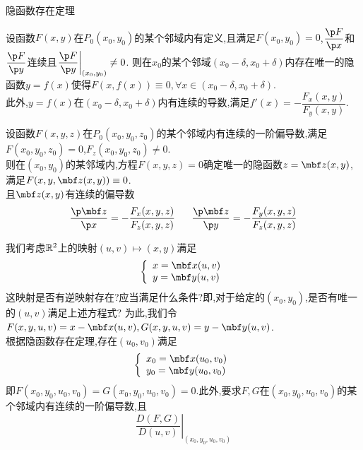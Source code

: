 \documentclass{ctexart}
\begin{document}
\pagestyle{empty}
\begin{center}\large 隐函数存在定理\end{center}
\begin{theorem}[Theorem I]
    设函数$F(x,y)$在$P_0(x_0,y_0)$的某个邻域内有定义,且满足$F(x_0,y_0)=0$,$\dfrac{\p F}{\p x}$和$\dfrac{\p F}{\p y}$连续且$\left.\dfrac{\p F}{\p y}\right|_{(x_0,y_0)}\neq0$.%
    则在$x_0$的某个邻域$(x_0-\delta,x_0+\delta)$内存在唯一的隐函数$y=f(x)$使得$F(x,f(x))\equiv0,\forall x\in(x_0-\delta,x_0+\delta)$.\\
    此外,$y=f(x)$在$(x_0-\delta,x_0+\delta)$内有连续的导数,满足$f'(x)=-\dfrac{F_x(x,y)}{F_y(x,y)}$.
\end{theorem}
\begin{theorem}[Theorem II]
    设函数$F(x,y,z)$在$P_0(x_0,y_0,z_0)$的某个邻域内有连续的一阶偏导数,满足$F(x_0,y_0,z_0)=0$,$F_z(x_0,y_0,z_0)\neq0$.\\
    则在$(x_0,y_0)$的某邻域内,方程$F(x,y,z)=0$确定唯一的隐函数$z=\mbf z(x,y)$,满足$F(x,y,\mbf z(x,y))\equiv0$.\\
    且$\mbf z(x,y)$有连续的偏导数
    \[\dfrac{\p\mbf z}{\p x}=-\dfrac{F_x(x,y,z)}{F_z(x,y,z)}\ \ \ \ \ \dfrac{\p\mbf z}{\p y}=-\dfrac{F_y(x,y,z)}{F_z(x,y,z)}\]
\end{theorem}
我们考虑$\mathbb{R}^2$上的映射$(u,v)\mapsto(x,y)$满足
\[\left\{\begin{array}{l}
    x=\mbf x(u,v)\\y=\mbf y(u,v)
\end{array}\right.\]
这映射是否有逆映射存在?应当满足什么条件?即,对于给定的$(x_0,y_0)$,是否有唯一的$(u,v)$满足上述方程式?%
为此,我们令$F(x,y,u,v)=x-\mbf x(u,v),G(x,y,u,v)=y-\mbf y(u,v)$.\\
根据隐函数存在定理,存在$(u_0,v_0)$满足
\[\left\{\begin{array}{l}
    x_0=\mbf x(u_0,v_0)\\y_0=\mbf y(u_0,v_0)
\end{array}\right.\]
即$F(x_0,y_0,u_0,v_0)=G(x_0,y_0,u_0,v_0)=0$.此外,要求$F,G$在$(x_0,y_0,u_0,v_0)$的某个邻域内有连续的一阶偏导数,且
\[\left.\dfrac{D(F,G)}{D(u,v)}\right|_{(x_0,y_0,u_0,v_0)}\]
\end{document}

